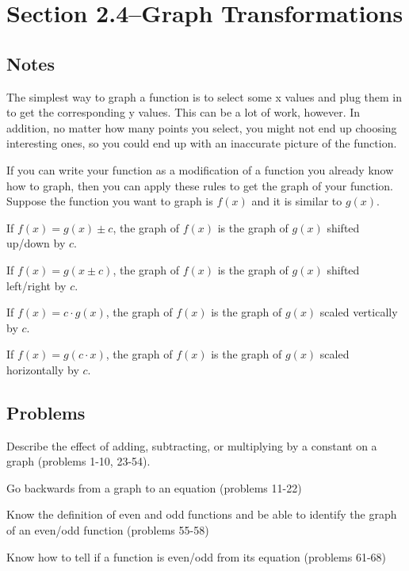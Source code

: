 \documentclass{article}
\begin{document}
\section{Section 2.4--Graph Transformations}

\subsection{Notes}

The simplest way to graph a function is to select some x values and plug them in to get the corresponding y values.
This can be a lot of work, however.  In addition, no matter how many points you select, you might not end up choosing
interesting ones, so you could end up with an inaccurate picture of the function.  

If you can write your function as a modification of a function you already know how to graph, then you can apply these
rules to get the graph of your function.  Suppose the function you want to graph is $f(x)$ and it is similar to
$g(x)$.

\begin{itemize*}
  \item If $f(x) = g(x) \pm c$, the graph of $f(x)$ is the graph of $g(x)$ shifted up/down by $c$.
  \item If $f(x) = g(x \pm c)$, the graph of $f(x)$ is the graph of $g(x)$ shifted left/right by $c$.
  \item If $f(x) = c \cdot g(x)$, the graph of $f(x)$ is the graph of $g(x)$ scaled vertically by $c$.  
  \item If $f(x) = g(c \cdot x)$, the graph of $f(x)$ is the graph of $g(x)$ scaled horizontally by $c$.  
\end{itemize*}

\subsection{Problems}
\begin{itemize*}
  \item Describe the effect of adding, subtracting, or multiplying by a constant on a graph (problems 1-10, 23-54).
  \item Go backwards from a graph to an equation (problems 11-22)
  \item Know the definition of even and odd functions and be able to identify the graph of an even/odd function
    (problems 55-58)
  \item Know how to tell if a function is even/odd from its equation (problems 61-68)
\end{itemize*}
\end{document}
